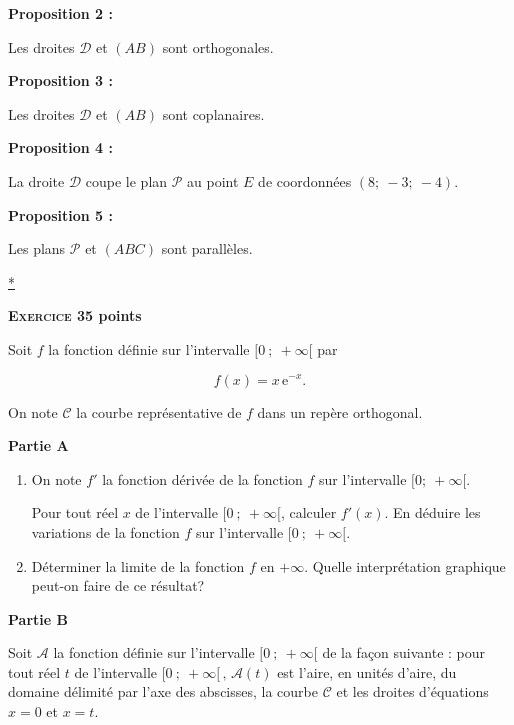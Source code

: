 \documentclass[10pt]{article}
\begin{document}
\textbf{Proposition 2 :}

Les droites $\mathcal{D}$ et $(AB)$ sont orthogonales.
\bigskip

\textbf{Proposition 3 :}

Les droites $\mathcal{D}$ et $(AB)$ sont coplanaires.
\bigskip

\textbf{Proposition 4 :}

La droite $\mathcal{D}$ coupe le plan $\mathcal{P}$ au point $E$ de coordonnées $(8;~-3;~-4)$.
\bigskip

\textbf{Proposition 5 :}

Les plans $\mathcal{P}$ et $(ABC)$ sont parallèles.

\hyperlink{Index}{*}
\newpage

\textbf{\textsc{Exercice 3}\hfill 5 points}

\medskip

Soit $f$ la fonction définie sur l'intervalle $[0~;~+\infty[$ par 

\[f(x) = x\,\mathrm{e}^{-x}.\]

On note $\mathcal{C}$ la courbe représentative de $f$ dans un repère orthogonal.
\medskip

\textbf{Partie A}

\begin{enumerate}
\item On note $f'$ la fonction dérivée de la fonction $f$ sur l'intervalle $[0;~+\infty[$.

Pour tout réel $x$ de l'intervalle $[0~;~+\infty[$, calculer $f'(x)$. En déduire les variations de la fonction $f$ sur l'intervalle $[0~;~+\infty[$.
\item Déterminer la limite de la fonction $f$ en $+ \infty$. Quelle interprétation graphique peut-on faire de ce résultat?
\end{enumerate}

\medskip

\textbf{Partie B}

\medskip

Soit $\mathcal{A}$ la fonction définie sur l'intervalle 
$[0~;~+\infty[$ de la façon suivante : pour tout réel $t$ de l'intervalle $[0~;~+\infty[\,,\,\mathcal{A}(t)$ est l'aire, en unités d'aire, du domaine délimité par l'axe des abscisses, la courbe $\mathcal{C}$ et les droites d'équations $x = 0$ et $x = t$.

\medskip
\end{document}
